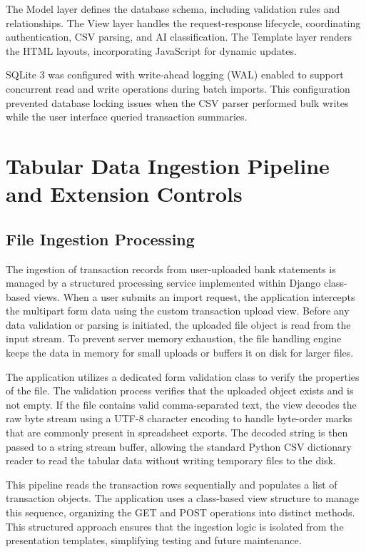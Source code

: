 The Model layer defines the database schema, including validation rules and relationships. The View layer handles the request-response lifecycle, coordinating authentication, CSV parsing, and AI classification. The Template layer renders the HTML layouts, incorporating JavaScript for dynamic updates.

SQLite 3 was configured with write-ahead logging (WAL) enabled to support concurrent read and write operations during batch imports. This configuration prevented database locking issues when the CSV parser performed bulk writes while the user interface queried transaction summaries.

\section{Tabular Data Ingestion Pipeline and Extension Controls}
\subsection{File Ingestion Processing}
The ingestion of transaction records from user-uploaded bank statements is managed by a structured processing service implemented within Django class-based views. When a user submits an import request, the application intercepts the multipart form data using the custom transaction upload view. Before any data validation or parsing is initiated, the uploaded file object is read from the input stream. To prevent server memory exhaustion, the file handling engine keeps the data in memory for small uploads or buffers it on disk for larger files.

The application utilizes a dedicated form validation class to verify the properties of the file. The validation process verifies that the uploaded object exists and is not empty. If the file contains valid comma-separated text, the view decodes the raw byte stream using a UTF-8 character encoding to handle byte-order marks that are commonly present in spreadsheet exports. The decoded string is then passed to a string stream buffer, allowing the standard Python CSV dictionary reader to read the tabular data without writing temporary files to the disk.

This pipeline reads the transaction rows sequentially and populates a list of transaction objects. The application uses a class-based view structure to manage this sequence, organizing the GET and POST operations into distinct methods. This structured approach ensures that the ingestion logic is isolated from the presentation templates, simplifying testing and future maintenance.


